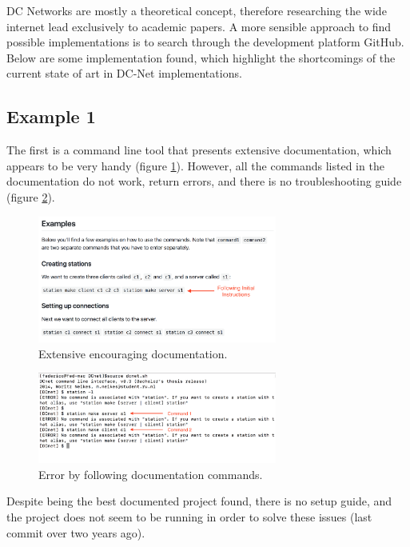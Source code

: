DC Networks are mostly a theoretical concept, therefore researching the wide internet lead exclusively to academic papers. A more sensible approach to find possible implementations is to search through the development platform GitHub. Below are some implementation found, which highlight the shortcomings of the current state of art in DC-Net implementations.

\subsection{Example 1}
The first is a command line tool that presents extensive documentation, which appears to be very handy (figure \ref{fig:work1documentation}). However, all the commands listed in the documentation do not work, return errors, and there is no troubleshooting guide (figure \ref{fig:work1error}).

\begin{figure}[h!]
    \centering
    \includegraphics[width=0.7\textwidth]{Images/work1WellDocumented.png}
    \caption{Extensive encouraging documentation.}
    \label{fig:work1documentation}
\end{figure}

\begin{figure}[h!]
    \centering
    \includegraphics[width=0.7\textwidth]{Images/work1WellDocumentedError.png}
    \caption{Error by following documentation commands.}
    \label{fig:work1error}
\end{figure}

Despite being the best documented project found, there is no setup guide, and the project does not seem to be running in order to solve these issues (last commit over two years ago).

